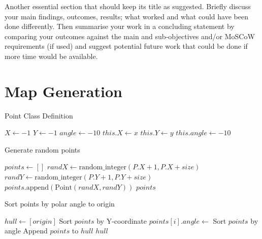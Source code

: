\documentclass[final]{cmpreport_02}
\begin{document}
Another essential section that should keep its title as suggested. Briefly discuss your main findings, outcomes, results; what worked and what could have been done differently. Then summarise your work in a concluding statement by comparing your outcomes against the main and sub-objectives and/or MoSCoW requirements (if used) and suggest potential future work that could be done if more time would be available.


\clearpage



\appendix
\clearpage

\section{Map Generation}

\begin{algorithm}[h!]
	\caption{Point Class Definition}
	\label{mg:point class}
	\begin{algorithmic}[1]
		\State $X \gets -1$ 
		\State $Y \gets -1$ 
		\State $angle \gets -10$ 
		\State $this.X \gets x$
		\State $this.Y \gets y$
		\State $this.angle \gets -10$ 
		\EndProcedure
		\EndProcedure
	\end{algorithmic}
\end{algorithm}

\begin{algorithm}[h!]
	\caption{Generate random points}
	\label{mg:genPoints}
	\begin{algorithmic}[1]
		\State $points \gets []$
		\State $randX \gets \text{random\_integer}(P.X + 1, P.X + size)$
		\State $randY \gets \text{random\_integer}(P.Y + 1, P.Y + size)$
		\State $points.\text{append}(\text{Point}(randX, randY))$
		\EndFor
		\State \Return $points$
		\EndFunction
	\end{algorithmic}
\end{algorithm}

\begin{algorithm}[h!]
	\caption{Sort points by polar angle to origin}
	\label{mg:sortPoints}
	\begin{algorithmic}[1]
		\State $hull \gets [origin]$
		\State Sort $points$ by Y-coordinate
		\State $points[i].angle \gets$ 
		\EndFor
		\State Sort $points$ by angle
		\State Append $points$ to $hull$
		\State \Return $hull$
		\EndFunction
	\end{algorithmic}
\end{algorithm}
\end{document}
